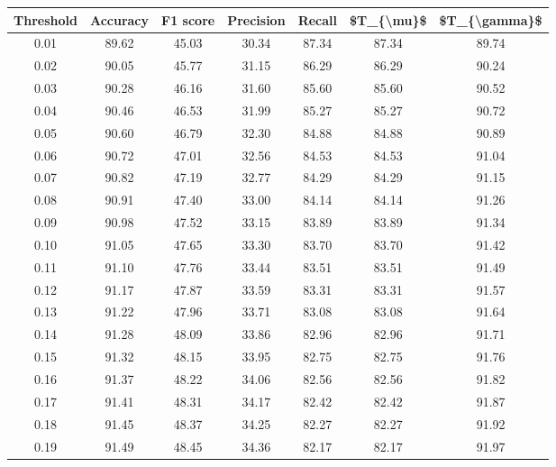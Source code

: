 \begin{tabular}{|c|c|c|c|c|c|c|}
\hline
 Threshold &  Accuracy &  F1 score &  Precision &  Recall &  \$T\_\{\textbackslash mu\}\$ &  \$T\_\{\textbackslash gamma\}\$ \\
\hline
      0.01 &     89.62 &     45.03 &      30.34 &   87.34 &      87.34 &         89.74 \\
      0.02 &     90.05 &     45.77 &      31.15 &   86.29 &      86.29 &         90.24 \\
      0.03 &     90.28 &     46.16 &      31.60 &   85.60 &      85.60 &         90.52 \\
      0.04 &     90.46 &     46.53 &      31.99 &   85.27 &      85.27 &         90.72 \\
      0.05 &     90.60 &     46.79 &      32.30 &   84.88 &      84.88 &         90.89 \\
      0.06 &     90.72 &     47.01 &      32.56 &   84.53 &      84.53 &         91.04 \\
      0.07 &     90.82 &     47.19 &      32.77 &   84.29 &      84.29 &         91.15 \\
      0.08 &     90.91 &     47.40 &      33.00 &   84.14 &      84.14 &         91.26 \\
      0.09 &     90.98 &     47.52 &      33.15 &   83.89 &      83.89 &         91.34 \\
      0.10 &     91.05 &     47.65 &      33.30 &   83.70 &      83.70 &         91.42 \\
      0.11 &     91.10 &     47.76 &      33.44 &   83.51 &      83.51 &         91.49 \\
      0.12 &     91.17 &     47.87 &      33.59 &   83.31 &      83.31 &         91.57 \\
      0.13 &     91.22 &     47.96 &      33.71 &   83.08 &      83.08 &         91.64 \\
      0.14 &     91.28 &     48.09 &      33.86 &   82.96 &      82.96 &         91.71 \\
      0.15 &     91.32 &     48.15 &      33.95 &   82.75 &      82.75 &         91.76 \\
      0.16 &     91.37 &     48.22 &      34.06 &   82.56 &      82.56 &         91.82 \\
      0.17 &     91.41 &     48.31 &      34.17 &   82.42 &      82.42 &         91.87 \\
      0.18 &     91.45 &     48.37 &      34.25 &   82.27 &      82.27 &         91.92 \\
      0.19 &     91.49 &     48.45 &      34.36 &   82.17 &      82.17 &         91.97 \\

\end{tabular}
